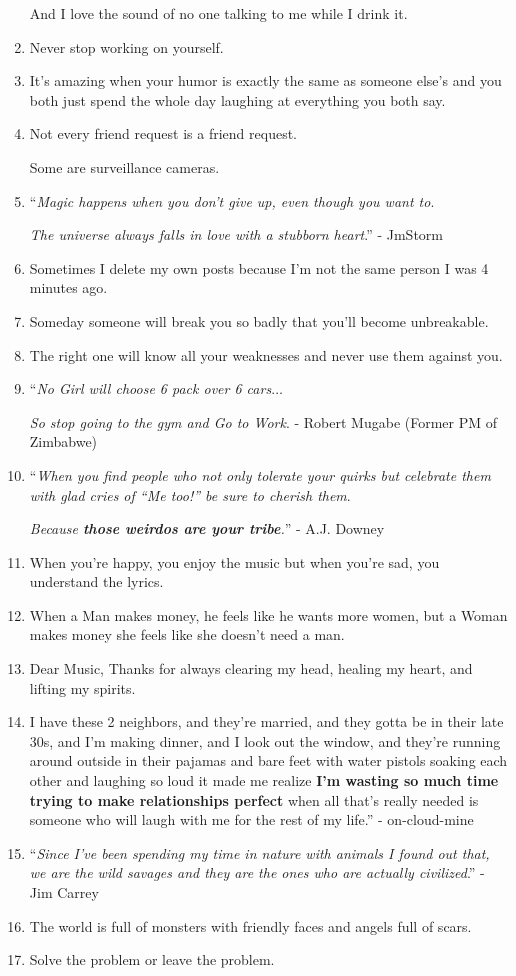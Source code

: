 \documentclass{article}
\begin{document}
\begin{enumerate}
	And I love the sound of no one talking to me while I drink it.
	\item Never stop working on yourself.
	\item It's amazing when your humor is exactly the same as someone else's and you both just spend the whole day laughing at everything you both say.
	\item Not every friend request is a friend request.
	
	Some are surveillance cameras.
	\item ``\textit{Magic happens when you don't give up, even though you want to}.
	
	\textit{The universe always falls in love with a stubborn heart}.'' - JmStorm
	\item Sometimes I delete my own posts because I'm not the same person I was 4 minutes ago.
	\item Someday someone will break you so badly that you'll become unbreakable.
	\item The right one will know all your weaknesses and never use them against you.
	\item ``\textit{No Girl will choose 6 pack over 6 cars}$\ldots$
	
	\textit{So stop going to the gym and Go to Work}. - Robert Mugabe (Former PM of Zimbabwe)
	\item ``\textit{When you find people who not only tolerate your quirks but celebrate them with glad cries of ``Me too!'' be sure to cherish them}.
	
	\textit{Because \textbf{those weirdos are your tribe}.}'' - A.J. Downey
	\item When you're happy, you enjoy the music but when you're sad, you understand the lyrics.
	\item When a Man makes money, he feels like he wants more women, but a Woman makes money she feels like she doesn't need a man.
	\item Dear Music, Thanks for always clearing my head, healing my heart, and lifting my spirits.
	\item I have these 2 neighbors, and they're married, and they gotta be in their late 30s, and I'm making dinner, and I look out the window, and they're running around outside in their pajamas and bare feet with water pistols soaking each other and laughing so loud it made me realize \textbf{I'm wasting so much time trying to make relationships perfect} when all that's really needed is someone who will laugh with me for the rest of my life.'' - on-cloud-mine
	\item ``\textit{Since I've been spending my time in nature with animals I found out that, we are the wild savages and they are the ones who are actually civilized}.'' - Jim Carrey
	\item The world is full of monsters with friendly faces and angels full of scars.
	\item Solve the problem or leave the problem.
	

\end{enumerate}
\end{document}
